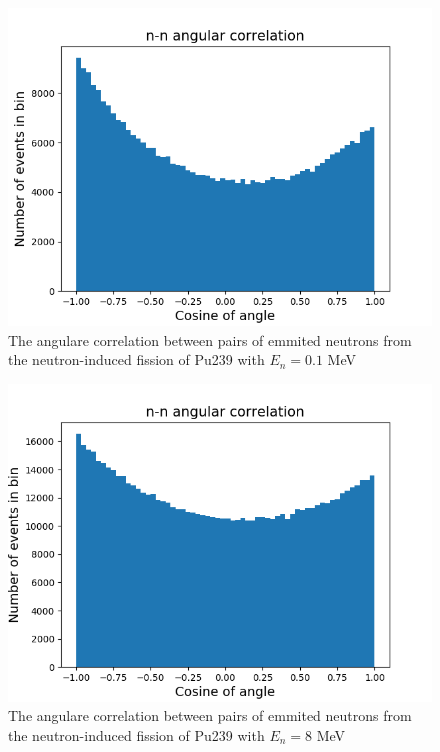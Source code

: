 \documentclass[]{article}
\begin{document}
\begin{figure} [H]
	\centering
	\includegraphics[scale=0.65]{Pu239_0_1_n_n_ang_corr.png}
	\caption{The angulare correlation between pairs of emmited neutrons from the neutron-induced fission of Pu239 with $E_n= 0.1$ MeV}
	\label{fig:Pu239_0_1_n_n_ang_corr}
\end{figure}

\begin{figure} [H]
	\centering
	\includegraphics[scale=0.65]{Pu239_8_n_n_ang_corr.png}
	\caption{The angulare correlation between pairs of emmited neutrons from the neutron-induced fission of Pu239 with $E_n= 8$ MeV}
	\label{fig:Pu239_8_n_n_ang_corr}
\end{figure}
\end{document}
